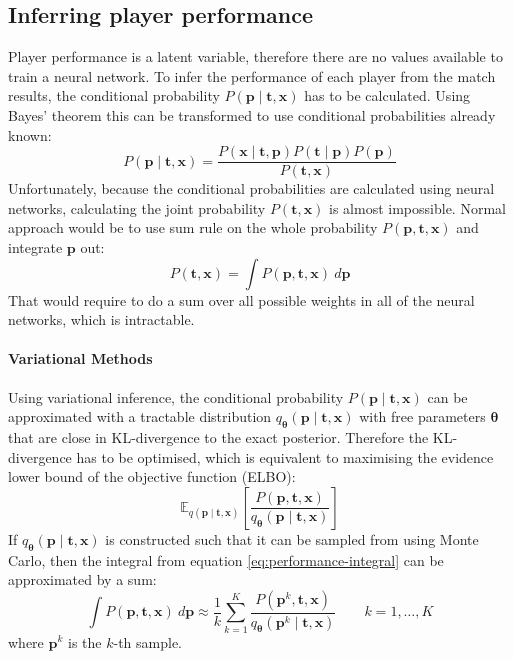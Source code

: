 \documentclass[12pt,a4paper]{book}
\newcommand\bs[1]{\boldsymbol{#1}}
\begin{document}
\subsection{Inferring player performance}
Player performance is a latent variable, therefore there are no values available to train a neural network.
To infer the performance of each player from the match results, the conditional probability $P(\bs{p}\mid\bs{t},\bs{x})$ has to be calculated.
Using Bayes' theorem this can be transformed to use conditional probabilities already known:
\begin{equation*}
P(\bs{p}\mid\bs{t},\bs{x}) = \frac{P(\bs{x}\mid\bs{t},\bs{p})P(\bs{t}\mid\bs{p})P(\bs{p})}{P(\bs{t},\bs{x})}
\end{equation*}
Unfortunately, because the conditional probabilities are calculated using neural networks, calculating the joint probability $P(\bs{t},\bs{x})$ is almost impossible.
Normal approach would be to use sum rule on the whole probability $P(\bs{p},\bs{t},\bs{x})$ and integrate $\bs{p}$ out:
\begin{equation}
P(\bs{t},\bs{x})=\int P(\bs{p},\bs{t},\bs{x})\ d\bs{p}
\label{eq:performance-integral}
\end{equation}
That would require to do a sum over all possible weights in all of the neural networks, which is intractable. 

\paragraph{Variational Methods}
Using variational inference, the conditional probability $P(\bs{p}\mid\bs{t},\bs{x})$ can be approximated with a tractable distribution $q_{\bs{\theta}}(\bs{p}\mid\bs{t},\bs{x})$ with free parameters $\bs{\theta}$ that are close in KL-divergence to the exact posterior.
Therefore the KL-divergence has to be optimised, which is equivalent to maximising the evidence lower bound of the objective function (ELBO):
\begin{equation*}
\mathbb{E}_{q(\bs{p}\mid\bs{t},\bs{x})}\left[\frac{P(\bs{p},\bs{t},\bs{x})}{q_{\bs{\theta}}(\bs{p}\mid\bs{t},\bs{x})}\right]
\end{equation*}
If $q_{\bs{\theta}}(\bs{p}\mid\bs{t},\bs{x})$ is constructed such that it can be sampled from using Monte Carlo, then the integral from equation \ref{eq:performance-integral} can be approximated by a sum:
\begin{equation*}
\int P(\bs{p},\bs{t},\bs{x})\ d\bs{p} \approx \frac{1}{k}\sum\limits_{k=1}^{K}\frac{P(\bs{p}^k,\bs{t},\bs{x})}{q_{\bs{\theta}}(\bs{p}^k\mid\bs{t},\bs{x})} \qquad k=1,\dots,K
\end{equation*}
where $\bs{p}^k$ is the $k$-th sample.
\end{document}
